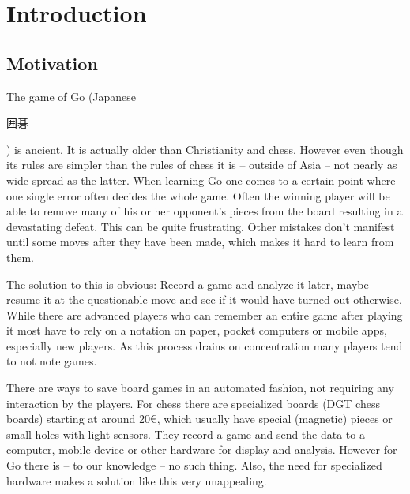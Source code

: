 
\chapter{Introduction}
	\section{Motivation}
	\label{introduction-motivation}
	The game of Go (Japanese \begingroup\setmainfont{Droid Sans Japanese}\small\begin{CJK}{UTF8}{min}囲碁\end{CJK}\endgroup ) is ancient. It is actually older than Christianity and chess. However even though its rules are simpler than the rules of chess it is -- outside of Asia -- not nearly as wide-spread as the latter. When learning Go one comes to a certain point where one single error often decides the whole game. Often the winning player will be able to remove many of his or her opponent's pieces from the board resulting in a devastating defeat. This can be quite frustrating. Other mistakes don't manifest until some moves after they have been made, which makes it hard to learn from them.

	The solution to this is obvious: Record a game and analyze it later, maybe resume it at the questionable move and see if it would have turned out otherwise. While there are advanced players who can remember an entire game after playing it most have to rely on a notation on paper, pocket computers or mobile apps, especially new players. As this process drains on concentration many players tend to not note games.

	There are ways to save board games in an automated fashion, not requiring any interaction by the players. For chess there are specialized boards (DGT chess boards) starting at around 20€, which usually have special (magnetic) pieces\cite{bulsink2001device} or small holes with light sensors. They record a game and send the data to a computer, mobile device or other hardware for display and analysis. However for Go there is -- to our knowledge -- no such thing. Also, the need for specialized hardware makes a solution like this very unappealing.

